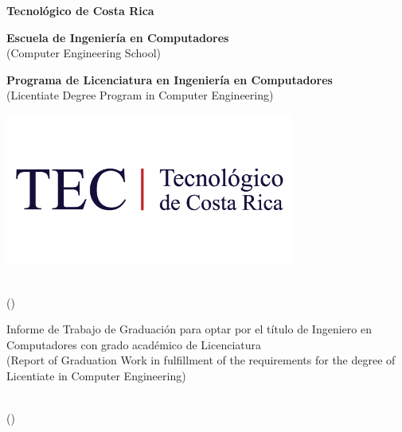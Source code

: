 
\thispagestyle{empty} 

\begin{center}

{\large\bf{Tecnológico de Costa Rica}}

\par\vspace{1ex}

{\large\bf{Escuela de Ingeniería en Computadores}}\\
{\normalsize (Computer Engineering School)}

\par\vspace{20mm}

{\large\bf{Programa de Licenciatura en Ingeniería en Computadores}} \\
{\normalsize (Licentiate Degree Program in Computer Engineering)}

\par\vspace{20mm}

\includegraphics[width=9.5cm]{fig/logo-tec.png}

\par\vspace*{\fill}

{\large\bf{\scriptTitleSpanish}}
\\
{\normalsize (\scriptTitle)}


\par\vspace*{\fill}

{\large Informe de Trabajo de Graduación para optar por el título de Ingeniero en Computadores con grado académico de Licenciatura}\\
{\scriptsize(Report of Graduation Work in fulfillment of the requirements for the degree of Licentiate in Computer Engineering)}


\par\vspace{20mm}

\scriptAuthor

\vspace*{\fill}


\normalsize {\spanishplacedate} \\
\scriptsize {(\placedate)}


\end{center}
\newpage 



